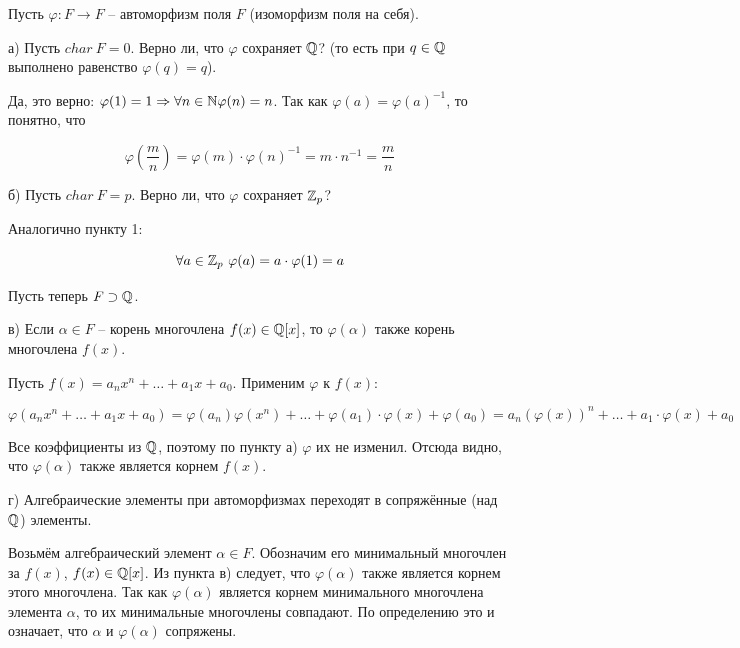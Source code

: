 Пусть $\varphi : F \to F$ -- автоморфизм поля $F$ (изоморфизм поля на себя).

а) Пусть $char\ F = 0$. Верно ли, что $\varphi$ сохраняет $\mathbb{Q}$? 
(то есть при $q \in \mathbb{Q}$ выполнено равенство $\varphi(q) = q$). 

Да, это верно: $\varphi(1) = 1 \Rightarrow \forall n \in \mathbb{N} \varphi(n) = n$.
Так как $\varphi(a) = \varphi(a)^{-1}$, то понятно, что

$$
\varphi \left( \frac{m}{n} \right) = \varphi(m) \cdot \varphi(n)^{-1} = 
m \cdot n^{-1} = \frac{m}{n}
$$

б) Пусть $char\ F = p$. Верно ли, что $\varphi$ сохраняет $\mathbb{Z}_p$?

Аналогично пункту 1:

$$
\forall a \in \mathbb{Z}_p \ \varphi(a) = a \cdot \varphi(1) = a
$$

Пусть теперь $F \supset \mathbb{Q}$.

в) Если $\alpha \in F$ -- корень многочлена $f(x) \in \mathbb{Q}[x]$, 
то $\varphi(\alpha)$ также корень многочлена $f(x)$.

Пусть $f(x) = a_n x^n + \dots + a_1 x + a_0$. Применим $\varphi$ к $f(x)$:

$$
\varphi(a_n x^n + \dots + a_1 x + a_0) = 
\varphi(a_n) \varphi(x^n) + \dots + 
\varphi(a_1) \cdot \varphi(x) + \varphi(a_0) = 
a_n (\varphi(x))^n + \dots + a_1 \cdot \varphi(x) + a_0
$$

Все коэффициенты из $\mathbb{Q}$, поэтому по пункту а) $\varphi$ их не изменил.
Отсюда видно, что $\varphi(\alpha)$ также является корнем $f(x)$.

г) Алгебраические элементы при автоморфизмах переходят в сопряжённые 
(над $\mathbb{Q}$) элементы.

Возьмём алгебраический элемент $\alpha \in F$. Обозначим его минимальный
многочлен за $f(x)$, $f(x) \in \mathbb{Q}[x]$. Из пункта в) следует, что
$\varphi(\alpha)$ также является корнем этого многочлена.
Так как $\varphi(\alpha)$ является корнем минимального многочлена элемента
$\alpha$, то их минимальные многочлены совпадают. По определению это и
означает, что $\alpha$ и $\varphi(\alpha)$ сопряжены.

